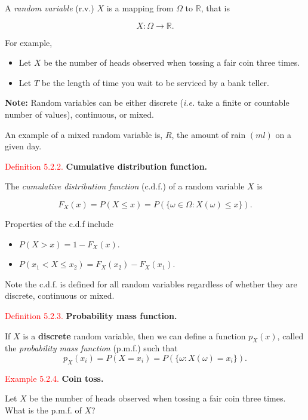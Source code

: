 \documentclass[
]{book}
\begin{document}
A \emph{random variable} (r.v.) \(X\) is a mapping from \(\Omega\) to \(\mathbb R\), that is

\[X:\Omega \longrightarrow \mathbb{R}.\]

For example,

\begin{itemize}
\item
  Let \(X\) be the number of heads observed when tossing a fair coin three times.
\item
  Let \(T\) be the length of time you wait to be serviced by a bank teller.
\end{itemize}

\textbf{Note:} Random variables can be either discrete (\emph{i.e.} take a finite or countable number of values), continuous, or mixed.

An example of a mixed random variable is, \(R\), the amount of rain \((ml)\) on a given day.

\leavevmode{}%
\textcolor{red}{Definition 5.2.2.}
{\textbf{Cumulative distribution function.}}

The \emph{cumulative distribution function} (c.d.f.) of a random variable \(X\) is

\[F_X(x) = P(X \leq x) = P(\{\omega\in\Omega:X(\omega)\leq x\}).\]

Properties of the c.d.f include

\begin{itemize}
\item
  \(P(X>x) = 1 - F_X(x)\).
\item
  \(P(x_1 < X \leq x_2) = F_X(x_2) - F_X(x_1)\).
\end{itemize}

Note the c.d.f. is defined for all random variables regardless of whether they are discrete, continuous or mixed.

\leavevmode{}%
\textcolor{red}{Definition 5.2.3.}
{\textbf{Probability mass function.}}

If \(X\) is a \textbf{discrete} random variable, then we can define a function \(p_X(x)\), called the \emph{probability mass function} (p.m.f.) such that\\

\[p_X(x_i) = P(X=x_i) = P(\{\omega:X(\omega)=x_i\}).\]

\leavevmode{}%
\textcolor{red}{Example 5.2.4.}
{\textbf{Coin toss.}}

Let \(X\) be the number of heads observed when tossing a fair coin three times. What is the p.m.f. of \(X\)?
\end{document}
